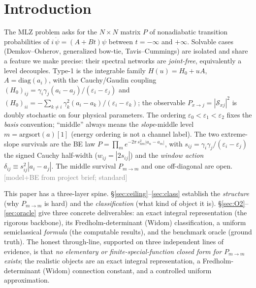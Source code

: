 \documentclass[aps,prd,reprint,nofootinbib]{revtex4-2}
\newcommand{\pnote}[1]{\textcolor{gray}{\footnotesize\,[#1]}}
\newcommand{\eps}{\varepsilon}
\newcommand{\Scat}{\mathcal{S}}   %
\newcommand{\Pmid}{P_{m\to m}}   %
\newcommand{\GE}{\Gamma_{\!E}} %
\begin{document}
\begin{abstract}
boundary. We verify, gold-gated, that no finite Barnes-$G$
/ Euler-$\GE$ product reproduces $\Pmid$; it closes only as a \emph{Fredholm-determinant} (Widom)
connection constant. \emph{Deliverables.} (1) an exact contour-integral representation
$\Scat_{xj}=\oint_{C_j}e^{-iuv}B(v)\,dv$ with explicitly-defined integrand, machine-verified; (2) a
uniform Dykhne--St\"uckelberg formula $\Pmid\!\approx\! f(\delta_{\rm lo},\delta_{\rm hi},\chi)$
accurate to RMS $\sim$1--2\% in the generic regime, exhibiting cleanly the
scale(actions)$\,\oplus\,$shape($\chi$) separation; (3) a $10^{-9}$ benchmark oracle as ground
truth. The exact-elementary target is, on three independent lines of evidence, absent.
\end{abstract}

\maketitle

\section{Introduction}
The MLZ problem asks for the $N\times N$ matrix $P$ of nonadiabatic transition probabilities of
$i\,\dot\psi=(A+Bt)\psi$ between $t=-\infty$ and $+\infty$. Solvable cases (Demkov--Osherov,
generalized bow-tie, Tavis--Cummings) are isolated and share a feature we make precise: their
spectral networks are \emph{joint-free}, equivalently a level decouples. Type-1 is the integrable
family $H(u)=H_0+uA$, $A=\mathrm{diag}(a_i)$, with the Cauchy/Gaudin coupling
$(H_0)_{ij}=\gamma_i\gamma_j(a_i-a_j)/(\eps_i-\eps_j)$ and
$(H_0)_{ii}=-\sum_{k\ne i}\gamma_k^2(a_i-a_k)/(\eps_i-\eps_k)$; the observable
$P_{x\to j}=|\Scat_{xj}|^2$ is doubly stochastic on four physical parameters. The ordering
$\eps_0<\eps_1<\eps_2$ fixes the \emph{basis} convention; ``middle'' always means the
\emph{slope}-middle level $m=\mathrm{argsort}(a)[1]$ (energy ordering is not a channel label). The
two extreme-slope survivals are the BE law $P=\prod_m e^{-2\pi\, s_{nm}^2|a_n-a_m|}$, with
$s_{ij}=\gamma_i\gamma_j/(\eps_i-\eps_j)$ the signed Cauchy half-width ($w_{ij}=|2s_{ij}|$) and the
\emph{window action} $\delta_{ij}\equiv s_{ij}^2|a_i-a_j|$. The middle survival $\Pmid$ and one
off-diagonal are open. \pnote{model+BE from project brief; standard}

This paper has a three-layer spine. \S\ref{sec:ceiling}--\ref{sec:class} establish the
\emph{structure} (why $\Pmid$ is hard) and the \emph{classification} (what kind of object it is).
\S\ref{sec:O2}--\ref{sec:oracle} give three concrete deliverables: an exact integral representation
(the rigorous backbone), its Fredholm-determinant (Widom) classification, a uniform semiclassical
\emph{formula} (the computable results), and the benchmark oracle (ground truth). The honest
through-line, supported on three independent lines of evidence, is that \emph{no elementary or
finite-special-function closed form for $\Pmid$ exists}; the realistic objects are an exact integral
representation, a Fredholm-determinant (Widom) connection constant, and a controlled uniform approximation.
\end{document}

